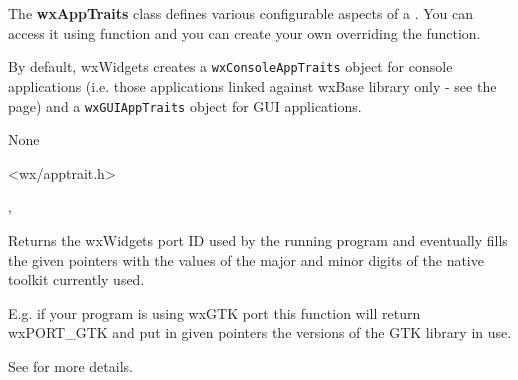 
\section{}\label{wxapptraits}

The {\bf wxAppTraits} class defines various configurable aspects of a .
You can access it using  function and you can
create your own  overriding the
 function.

By default, wxWidgets creates a {\tt wxConsoleAppTraits} object for console applications
(i.e. those applications linked against wxBase library only - see the
 page) and a {\tt wxGUIAppTraits} object for GUI
applications.


None


<wx/apptrait.h>


, 



\label{wxapptraitsgettoolkitversion}


Returns the wxWidgets port ID used by the running program and eventually
fills the given pointers with the values of the major and minor digits
of the native toolkit currently used.

E.g. if your program is using wxGTK port this function will return wxPORT_GTK and
put in given pointers the versions of the GTK library in use.

See  for more details.



